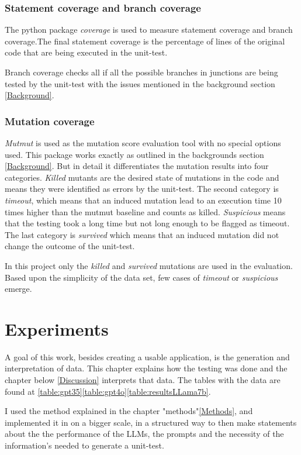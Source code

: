 \documentclass[a4paper,11pt,oneside]{memoir}
\begin{document}
\subsection{Statement coverage and branch coverage}
The python package \textit{coverage} is used to measure statement coverage and branch coverage.The final statement coverage is the percentage of lines of the original code that are being executed in the unit-test.

Branch coverage checks all if all the possible branches in junctions are being tested by the unit-test with the issues mentioned in the background section \ref{Background}.

\subsection{Mutation coverage}
\textit{Mutmut} is used as the mutation score evaluation tool with no special options used. This package works exactly as outlined in the backgrounds section \ref{Background}. But in detail it differentiates the mutation results into four categories. \textit{Killed} mutants are the desired state of mutations in the code and means they were identified as errors by the unit-test. The second category is \textit{timeout}, which means that an induced mutation lead to an execution time 10 times higher than the mutmut baseline and counts as killed. \textit{Suspicious} means that the testing took a long time but not long enough to be flagged as timeout. The last category is \textit{survived} which means that an induced mutation did not change the outcome of the unit-test. 

In this project only the \textit{killed} and \textit{survived} mutations are used in the evaluation. Based upon the simplicity of the data set, few cases of \textit{timeout} or \textit{suspicious} emerge.



\chapter{Experiments}
\label{Experiments}
A goal of this work, besides creating a usable application, is the generation and interpretation of data. This chapter explains how the testing was done and the chapter below \ref{Discussion} interprets that data. The tables with the data are found at \ref{table:gpt35}\ref{table:gpt4o}\ref{table:resultsLLama7b}.

I used the method explained in the chapter "methods"\ref{Methods}, and implemented it in on a bigger scale, in a structured way to then make statements about the the performance of the LLMs, the prompts and the necessity of the information's needed to generate a unit-test.
\end{document}
